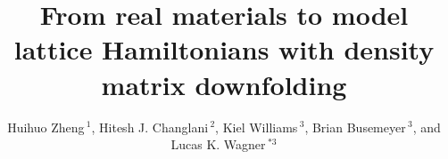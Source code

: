 \documentclass[utf8,latin9]{frontiersFPHY}
\renewcommand\abstractname{}
\def\firstAuthorLast{H. Zheng et al.} %
\def\Authors{Huihuo Zheng\,$^{1}$, Hitesh J. Changlani\,$^{2}$, Kiel Williams\,$^{3}$, Brian Busemeyer\,$^{3}$, and Lucas K. Wagner\,$^{*3}$}
\begin{document}
\onecolumn
{}

\title[Density matrix downfolding]{From real materials to model lattice Hamiltonians with density matrix downfolding}
\author[\firstAuthorLast ]{\Authors} %
\address{} %
\correspondance{} %
\extraAuth{}
\maketitle
\end{document}
